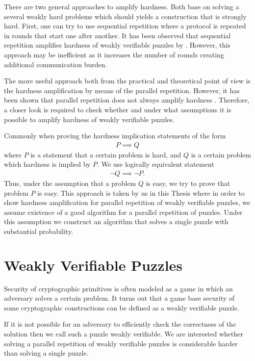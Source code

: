 \documentclass[11pt,a4paper,titlepage]{memoir}
\begin{document}
There are two general approaches to amplify hardness. Both base on solving a several weakly hard problems which should yields a construction that is strongly hard.
First, one can try to use sequential repetition where a protocol is repeated in rounds that start one after another.
It has been observed that sequential repetition amplifies hardness of weakly verifiable puzzles by \cite{von2003captcha}.
However, this approach may be inefficient as it increases the number of rounds creating additional communication burden.

The more useful approach both from the practical and theoretical point of view is the hardness amplification by means of the
parallel repetition. However, it has been shown that parallel repetition does not always amplify hardness \cite{bellare1997does}.
Therefore, a closer look is required to check whether and under what assumptions it is possible to amplify hardness of weakly verifiable puzzles.

Commonly when proving the hardness implication statements of the form
\begin{align*}
  P \implies Q
\end{align*}
where $P$ is a statement that a certain problem is hard, and $Q$ is a certain problem which hardness is implied by $P$.
We use logically equivalent statement
\begin{align*}
  \lnot Q \implies \lnot P.
\end{align*}
Thus, under the assumption that a problem $Q$ is easy, we try to prove that problem $P$ is easy.
This approach is taken by us in this Thesis where in order to show hardness amplification for parallel repetition of weakly verifiable puzzles,
we assume existence of a good algorithm for a parallel repetition of puzzles.
Under this assumption we construct an algorithm that solves a single puzzle with substantial probability.

\section{Weakly Verifiable Puzzles}
Security of cryptographic primitives is often modeled as a game in which an adversary solves a certain problem.
It turns out that a game base security of some cryptographic constructions can be defined as a weakly verifiable puzzle.

If it is not possible for an adversary to efficiently check the correctness of the solution then
we call such a puzzle weakly verifiable. We are interested whether solving a parallel repetition of weakly verifiable puzzles
is considerable harder than solving a single puzzle.
\end{document}
